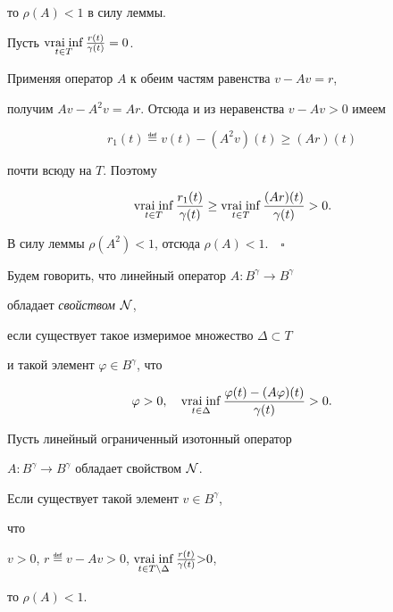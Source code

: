 то $\rho(A)<1$ в силу леммы.





Пусть $\vraiinf\limits_{t\in T} \frac{r(t)}{\gamma(t)} =0$.


Применяя оператор $A$ к обеим частям равенства $v-Av=r$,


получим $Av-A^2v=Ar$. Отсюда и из неравенства $v-Av>0$ имеем


$$


r_1(t)\eqdef v(t) - (A^2v)(t) \geq (Ar)(t)


$$


почти всюду на $T$. Поэтому


$$


\vraiinf_{t\in T}\frac{r_1(t)}{\gamma(t)}\geq \vraiinf_{t\in T}


\frac{(Ar)(t)}{\gamma(t)} >0.


$$


В силу леммы $\rho(A^2)<1$, отсюда $\rho(A)<1.\quad\square$





Будем говорить, что линейный оператор $A:B^\gamma\to B^\gamma$


обладает {\it свойством} $\cal N$,


если существует такое измеримое множество $\Delta\subset T$


и такой элемент $\varphi\in B^\gamma$, что


$$


\varphi >0,\quad


\vraiinf_{t\in\Delta}\frac{\varphi(t)-(A\varphi)(t)}{\gamma(t)} >0.


$$





\begin{thm}


Пусть линейный ограниченный изотонный оператор


$A:B^\gamma\to B^\gamma$ обладает свойством $\cal N$.


Если существует такой элемент $v\in B^{\gamma}$,


что


$v{>}0$, $r\eqdef v-Av{ >}0$, $\vraiinf\limits_{t\in


T\setminus\Delta}\frac{r(t)}{\gamma(t)}{ >}0$,


то $\rho(A)<1$.


\end{thm}





